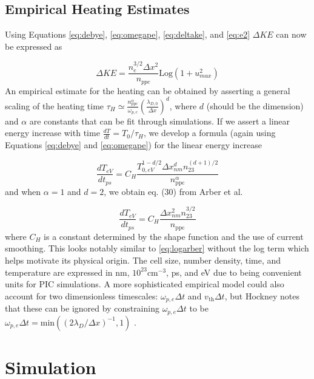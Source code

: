 \subsection{Empirical Heating Estimates}

Using Equations \ref{eq:debye}, \ref{eq:omegape}, \ref{eq:deltake}, and \ref{eq:e2} $\Delta KE$ can now be expressed as 

\begin{equation}
	\Delta KE = \frac{n_e^{3/2} \Delta x^2}{n_{ppc}} \text{Log}(1 + u_{max}^2) \label{eq:logarber}
\end{equation}
An empirical estimate for the heating can be obtained by asserting a general scaling of the heating time $\tau_H \simeq \frac{n_\text{ppc}^\alpha}{\omega_{p,e}} \left(\frac{\lambda_{D,0}}{\Delta x}\right)^d$, where $d$ (should be the dimension) and $\alpha$ are constants that can be fit through simulations. If we assert a linear energy increase with time $\frac{dT}{dt} = T_0 / \tau_H$, we develop a formula (again using Equations \ref{eq:debye} and \ref{eq:omegape}) for the linear energy increase 

\begin{equation}
	\frac{dT_{eV}}{dt_{ps}} = C_H \frac{T_{0,eV}^{1 - d/2} \Delta x_{nm}^d n_{23}^{(d + 1)/2}}{n_\text{ppc}^\alpha} \label{eq:generalizedarber}
\end{equation}
and when $\alpha = 1$ and $d = 2$, we obtain eq. (30) from Arber et al. \cite{Arber_2015_PPCF}

\begin{equation}
	\frac{dT_{eV}}{dt_{ps}} = C_H \frac{\Delta x_{nm}^2 n_{23}^{3/2}}{n_\text{ppc}} \label{eq:arber}
\end{equation}
where $C_H$ is a constant determined by the shape function and the use of current smoothing. This looks notably similar to \autoref{eq:logarber} without the log term which helps motivate its physical origin. The cell size, number density, time, and temperature are expressed in nm, $10^{23} \text{cm}^{-3}$, ps, and eV due to being convenient units for PIC simulations. A more sophisticated empirical model could also account for two dimensionless timescales: $\omega_{p, e} \Delta t$ and $v_\text{th} \Delta t$, but Hockney \cite{Hockney_1971_JoCP} notes that these can be ignored by constraining $\omega_{p,e} \Delta t$ to be $\omega_{p,e} \Delta t = \text{min}((2 \lambda_D / \Delta x)^{-1}, 1)$ \cite{Hockney_1971_JoCP}.

\section{Simulation}
